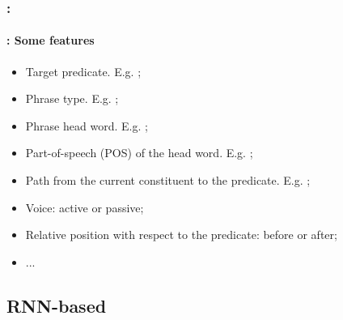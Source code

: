 \documentclass[xcolor=table]{beamer}
\begin{document}
\begin{frame}
	\frametitle{\insertshortsubtitle: \insertsection}
	\framesubtitle{\insertsubsection: Some features}
	
	\begin{itemize}
		\item Target predicate. E.g. ;
		\item Phrase type. E.g. ;
		\item Phrase head word. E.g. ; 
		\item Part-of-speech (POS) of the head word. E.g. ;
		\item Path from the current constituent to the predicate. E.g. ;
		\item Voice: active or passive;
		\item Relative position with respect to the predicate: before or after;
		\item ...
	\end{itemize}
	
\end{frame}

\subsection{RNN-based}
\end{document}

